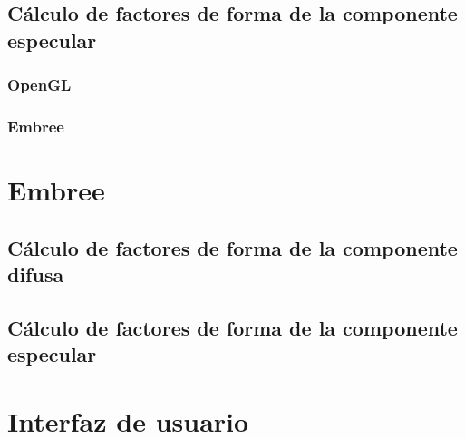 \subsection{Cálculo de factores de forma de la componente especular}

\subsubsection{OpenGL}

\subsubsection{Embree}

\section{Embree}
\label{sec:embree-impl}

\subsection{Cálculo de factores de forma de la componente difusa}

\subsection{Cálculo de factores de forma de la componente especular}


\section {Interfaz de usuario}
